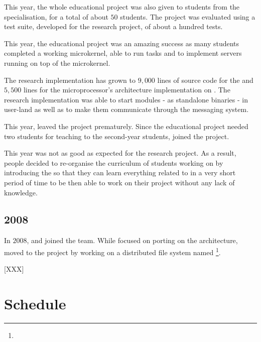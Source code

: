 \begin{multicols}{2}
This year, the whole  educational project was also given to
students from the  specialisation, for a
total of about $50$ students. The project was evaluated using a test suite,
developed for the  research project, of about a hundred tests.

This year, the  educational project was an amazing success as
many students completed a working microkernel, able to run tasks and to
implement servers running on top of the  microkernel.

The  research implementation has grown to $9,000$ lines of source
code for the  and $5,500$ lines for the microprocessor's
architecture implementation on . The  research
implementation was able to start modules - as standalone binaries - in
user-land as well as to make them communicate through the 
messaging system.

This year,  leaved the project prematurely. Since the
educational project needed two students for teaching  to the
second-year students,  joined the project.

This year was not as good as expected for the  research project.
As a result,  people decided to re-organise the curriculum of
students working on  by introducing the  so that they can learn everything related to  in
a very short period of time to be then able to work on their project without
any lack of knowledge.

%
%
\subsection{2008}

In $2008$,  and  joined the team.
While  focused on porting  on the
 architecture,  moved to the
 project by working on a distributed file
system named \footnote{}.

[XXX]

%
%

\section{Schedule}


\end{multicols}
